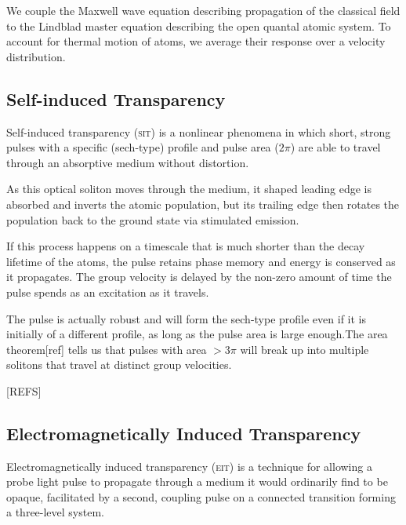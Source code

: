     We couple the Maxwell wave equation describing propagation of the classical
    field to the Lindblad master equation describing the open quantal atomic
    system. To account for thermal motion of atoms, we average their response
    over a velocity distribution.\cite{foot2005atomic}


  \subsection*{Self-induced Transparency}

    Self-induced transparency (\textsc{sit}) is a nonlinear phenomena in which
    short, strong pulses with a specific (sech-type) profile and pulse area
    ($2\pi$) are able to travel through an absorptive medium without distortion.

    As this optical soliton moves through the medium, it shaped leading edge is
    absorbed and inverts the atomic population, but its trailing edge then
    rotates the population back to the ground state via stimulated emission.

    If this process happens on a timescale that is much shorter than the decay
    lifetime of the atoms, the pulse retains phase memory and energy is
    conserved as it propagates. The group velocity is delayed by the non-zero
    amount of time the pulse spends as an excitation as it travels.

    The pulse is actually robust and will form the sech-type profile even if it
    is initially of a different profile, as long as the pulse area is large
    enough.The area theorem[ref] tells us that pulses with area $> 3\pi$ will
    break up into multiple solitons that travel at distinct group velocities.

    [REFS]

  \subsection*{Electromagnetically Induced Transparency}

    Electromagnetically induced transparency (\textsc{eit}) is a technique for
    allowing a probe light pulse to propagate through a medium it would
    ordinarily find to be opaque, facilitated by a second, coupling pulse on a
    connected transition forming a three-level system.\cite{Fleischhauer2005,Harris1997,Harris1990}

